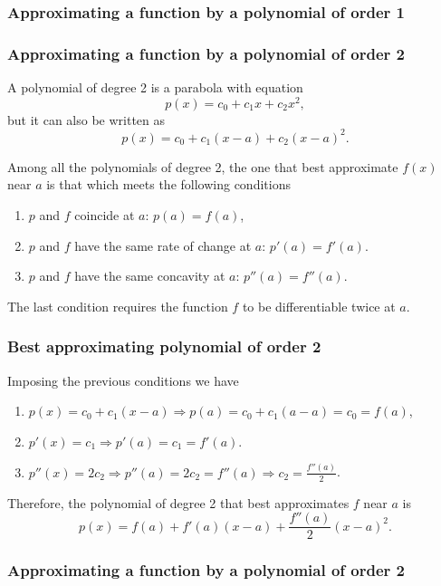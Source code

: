 \begin{frame}
\frametitle{Approximating a function by a polynomial of order 1}
\begin{center}

\end{center}
\end{frame}


\begin{frame}
\frametitle{Approximating a function by a polynomial of order 2}
A polynomial of degree 2 is a parabola with equation
\[
p(x) = c_0+c_1x+c_2x^2,
\]
but it can also be written as
\[
p(x) = c_0+c_1(x-a)+c_2(x-a)^2.
\]

Among all the polynomials of degree 2, the one that best approximate $f(x)$ near $a$ is that which meets the following conditions
\begin{enumerate}
\item $p$ and $f$ coincide at $a$: $p(a) = f(a)$,
\item $p$ and $f$ have the same rate of change at $a$: $p'(a) = f'(a)$.
\item $p$ and $f$ have the same concavity at $a$: $p''(a)=f''(a)$.
\end{enumerate}
The last condition requires the function $f$ to be differentiable twice at $a$.
\end{frame}


\begin{frame}
\frametitle{Best approximating polynomial of order 2}
Imposing the previous conditions we have
\begin{enumerate}
\item $p(x)=c_0+c_1(x-a) \Rightarrow p(a)=c_0+c_1(a-a)=c_0=f(a)$,
\item $p'(x)=c_1 \Rightarrow p'(a)=c_1=f'(a)$.
\item $p''(x)=2c_2 \Rightarrow p''(a)=2c_2=f''(a) \Rightarrow c_2=\frac{f''(a)}{2}$.
\end{enumerate}

Therefore, the polynomial of degree 2 that best approximates $f$ near $a$ is
\[
p(x) = f(a)+f'(a)(x-a)+\frac{f''(a)}{2}(x-a)^2.
\]
\end{frame}


\begin{frame}
\frametitle{Approximating a function by a polynomial of order 2}
\begin{center}

\end{center}
\end{frame}


